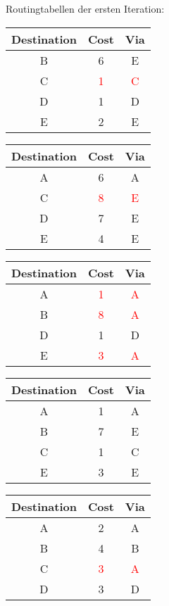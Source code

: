 \documentclass[a4paper,
			llpt,
			solution,
			accentcolor=tud2d,
			colorbacktitle
			]
			{tudexercise}
\newcommand{\8}{$\infty$}
\begin{document}
Routingtabellen der ersten Iteration:
\begin{multicols}{3}
\begin{tabular}{c|c|c}
Destination & Cost & Via \\ \hline
B           & 6    & E   \\
C           & \textcolor{red}{1}    & \textcolor{red}{C}   \\
D           & 1    & D   \\
E           & 2    & E   \\
\end{tabular}
\begin{tabular}{c|c|c}
Destination & Cost & Via \\ \hline
A           & 6    & A   \\
C           & \textcolor{red}{8}   & \textcolor{red}{E}   \\
D           & 7    & E   \\
E           & 4    & E   \\
\end{tabular}
\begin{tabular}{c|c|c}
Destination & Cost & Via \\ \hline
A           & \textcolor{red}{1}    & \textcolor{red}{A}   \\
B           & \textcolor{red}{8}    & \textcolor{red}{A}   \\
D           & 1    & D   \\
E           & \textcolor{red}{3}    & \textcolor{red}{A}   \\
\end{tabular}
\begin{tabular}{c|c|c}
Destination & Cost & Via \\ \hline
A           & 1    & A   \\
B           & 7    & E   \\
C           & 1    & C   \\
E           & 3    & E   \\
\end{tabular}
\begin{tabular}{c|c|c}
Destination & Cost & Via \\ \hline
A           & 2    & A   \\
B           & 4    & B   \\
C           & \textcolor{red}{3}    & \textcolor{red}{A}   \\
D           & 3    & D   \\
\end{tabular}
\end{multicols}
\end{document}
